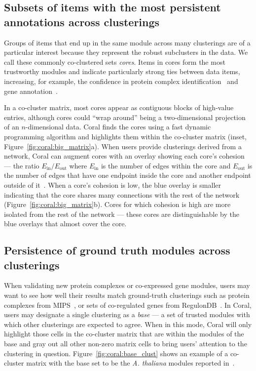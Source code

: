 \documentclass[12pt]{cmuthesis}
\newcommand\Coral{Coral\xspace}
\newcommand{\Athal}{\textit{A. thaliana}\xspace}
\begin{document}
  \subsection{Subsets of items with the most persistent annotations across clusterings}
  \label{sec:cores}

  Groups of items that end up in the same module across many clusterings are of a particular interest because they represent the robust subclusters in the data. We call these commonly co-clustered sets \textit{cores}. Items in cores form the most trustworthy modules and indicate particularly strong ties between data items, increasing, for example, the confidence in protein complex identification~\cite{Luo2009} and gene annotation~\cite{Saha}.

  In a co-cluster matrix, most cores appear as contiguous blocks of high-value entries, although cores could ``wrap around'' being a two-dimensional projection of an $n$-dimensional data. \Coral finds the cores using a fast dynamic programming algorithm and highlights them within the co-cluster matrix (inset, Figure~\ref{fig:coral:big_matrix}a). When users provide clusterings derived from a network, \Coral can augment cores with an overlay showing each core's cohesion --- the ratio $E_\textrm{in} / E_\textrm{out}$ where $E_\textrm{in}$ is the number of edges within the core and $E_\textrm{out}$ is the number of edges that have one endpoint inside the core and another endpoint outside of it~\cite{Bailey1982}. When a core's cohesion is low, the blue overlay is smaller indicating that the core shares many connections with the rest of the network (Figure~\ref{fig:coral:big_matrix}b). Cores for which cohesion is high are more isolated from the rest of the network --- these cores are distinguishable by the blue overlays that almost cover the core.


  \subsection{Persistence of ground truth modules across clusterings}

  When validating new protein complexes or co-expressed gene modules, users may want to see how well their results match ground-truth clusterings such as protein complexes from MIPS~\cite{Mewes2011}, or sets of co-regulated genes from RegulonDB~\cite{Gama-Castro2011}. In \Coral, users may designate a single clustering as a \textit{base} --- a set of trusted modules with which other clusterings are expected to agree. When in this mode, \Coral will only highlight those cells in the co-cluster matrix that are within the modules of the base and gray out all other non-zero matrix cells to bring users' attention to the clustering in question. Figure~\ref{fig:coral:base_clust} shows an example of a co-cluster matrix with the base set to be the \Athal modules reported in~\cite{Vidal2011}.
\end{document}
